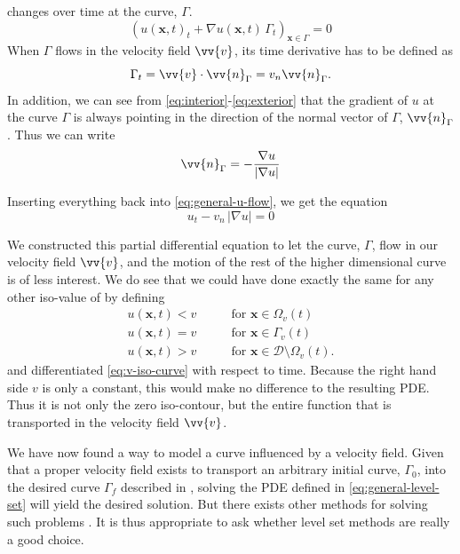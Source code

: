changes over time at the curve, $\Gamma$. 
\begin{equation}
    (u(\mathbf{x}, t)_t + \nabla u(\mathbf{x}, t) \, \Gamma_t)_{\mathbf{x}\in \Gamma} = 0
    \label{eq:general-u-flow}
\end{equation}
When $\Gamma$ flows in the velocity field $\vv{v}$, its time derivative has to be 
defined as 
\begin{equation}
    \Gamma_t = \vv{v}\cdot \vv{n}_{\Gamma} = v_n \vv{n}_{\Gamma}.
\end{equation}
In addition, we can see from \eqref{eq:interior}-\eqref{eq:exterior} that the gradient 
of $u$ at the curve $\Gamma$ is always pointing in the direction of the normal vector of 
$\Gamma$, $\vv{n}_{\Gamma}$. Thus we can write 
\begin{equation}
    \vv{n}_{\Gamma} = -\frac{\nabla u}{|\nabla u|}
\end{equation}

Inserting everything back into \eqref{eq:general-u-flow}, we get the equation
\begin{equation}
    u_t - v_n\, |\nabla u| = 0
    \label{eq:general-level-set}
\end{equation}

We constructed this partial differential equation to let the curve, $\Gamma$, flow in 
our velocity field $\vv{v}$, and the motion of the rest of the higher dimensional curve
\uxt is of less interest. We do see that we could have done exactly the same for 
any other iso-value of \uxt by defining 
\begin{align}
    u(\mathbf{x}, t) < v \qquad &\text{for } \mathbf{x} \in  \Omega_v(t) \label{eq:v-interior}\\
    u(\mathbf{x}, t) = v \qquad &\text{for } \mathbf{x} \in  \Gamma_v(t) \label{eq:v-iso-curve}\\
    u(\mathbf{x}, t) > v \qquad &\text{for } \mathbf{x} \in  \mathcal{D} \setminus \Omega_v(t) \label{eq:v-exterior}.
\end{align}
and differentiated \eqref{eq:v-iso-curve} with respect to time. Because the right hand 
side $v$ is only a constant, this would make no difference to the resulting PDE. Thus
it is not only the zero iso-contour, but the entire function \uxt that is transported 
in the velocity field $\vv{v}$.

We have now found a way to model a curve influenced by a velocity field. Given that 
a proper velocity field exists to transport an arbitrary initial curve, $\Gamma_0$,
into the desired curve $\Gamma_f$ described in , solving the PDE defined
in \eqref{eq:general-level-set} will yield the desired solution. But there exists other
methods for solving such problems . It is thus appropriate to ask whether 
level set methods are really a good choice. 




